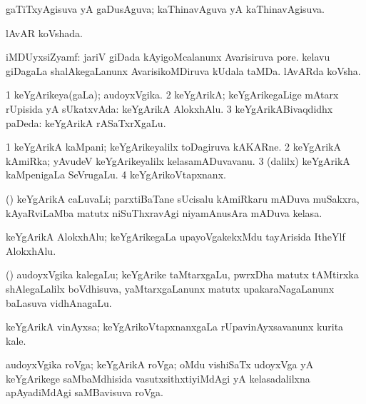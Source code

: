 \bentry
{}
\gl{\gu}
\bmng
gaTiTxyAgisuva yA gaDusAguva; kaThinavAguva yA kaThinavAgisuva. 
\emng
\eentry

\bentry
{}
\gl{\gu}
\bmng
lAvAR koVshada. 
\emng
\eentry

\bentry
{}
\gl{\nA}
\bmng
iMDUyxsiZyamf: 
\banum
{} jariV giDada kAyigoMcalanunx Avarisiruva pore. 
 kelavu giDagaLa shalAkegaLanunx AvarisikoMDiruva kUdala taMDa. 
 lAvARda koVsha. 
\eanum
\emng
\eentry

\bentry
{}
\gl{\gu}
\bmng
\bnum
\num{1} keYgArikeya(gaLa); audoyxVgika. 
\num{2} keYgArikA; keYgArikegaLige mAtarx rUpisida yA sUkatxvAda:  keYgArikA AlokxhAlu. 
\num{3} keYgArikABivaqdidhx paDeda:  keYgArikA rASaTxrXgaLu. 
\enum
\emng
\eentry

\bentry
{}
\gl{\nA}
\bmng
\bnum
\num{1} keYgArikA kaMpani; keYgArikeyalilx toDagiruva kAKARne. 
\num{2} keYgArikA kAmiRka; yAvudeV keYgArikeyalilx kelasamADuvavanu. 
\num{3} (\bava dalilx) keYgArikA kaMpenigaLa SeVrugaLu. 
\num{4} keYgArikoVtapxnanx. 
\enum
\emng
\eentry

\bentry
{}
\gl{\nA}
\bmng
(\birx) keYgArikA caLuvaLi; parxtiBaTane sUcisalu kAmiRkaru mADuva muSakxra, kAyaRviLaMba matutx niSuThxravAgi niyamAnusAra mADuva kelasa. 
\emng
\eentry

\bentry
{}
\gl{\nA}
\bmng
keYgArikA AlokxhAlu; keYgArikegaLa upayoVgakekxMdu tayArisida ItheYlf AlokxhAlu. 
\emng
\eentry

\bentry
{}
\gl{\nA}
\bmng
(\bava) audoyxVgika kalegaLu; keYgArike taMtarxgaLu, pwrxDha matutx tAMtirxka shAlegaLalilx boVdhisuva, yaMtarxgaLanunx matutx upakaraNagaLanunx baLasuva vidhAnagaLu. 
\emng
\eentry

\bentry
{}
\gl{\nA}
\bmng
keYgArikA vinAyxsa; keYgArikoVtapxnanxgaLa rUpavinAyxsavanunx kurita kale. 
\emng
\eentry

\bentry
{}
\gl{\nA}
\bmng
audoyxVgika roVga; keYgArikA roVga; oMdu vishiSaTx udoyxVga yA keYgArikege saMbaMdhisida vasutxsithxtiyiMdAgi yA kelasadalilxna apAyadiMdAgi saMBavisuva roVga. 
\emng
\eentry

